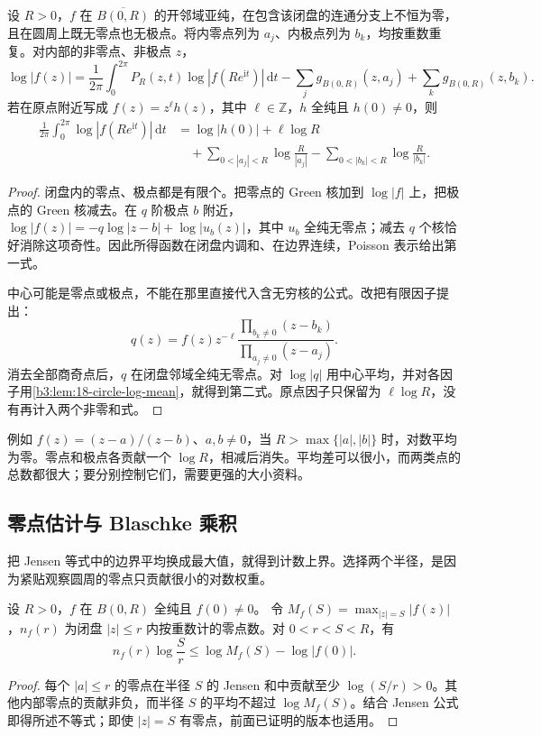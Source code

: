 \begin{proposition}\label{b3:prop:18-meromorphic-jensen}
设 \(R>0\)，\(f\) 在 \(\overline{B(0,R)}\) 的开邻域亚纯，在包含该闭盘的连通分支上不恒为零，且在圆周上既无零点也无极点。将内零点列为 \(a_j\)、内极点列为 \(b_k\)，均按重数重复。对内部的非零点、非极点 \(z\)，
\[
 \log|f(z)|=\frac1{2\pi}\int_0^{2\pi}
 P_R(z,t)\log|f(Re^{\mathrm it})|\,\mathrm dt
 -\sum_jg_{B(0,R)}(z,a_j)+\sum_kg_{B(0,R)}(z,b_k).
\]
若在原点附近写成 \(f(z)=z^\ell h(z)\)，其中
\(\ell\in\mathbb Z\)，\(h\) 全纯且 \(h(0)\ne0\)，则
\begin{align*}
 \frac1{2\pi}\int_0^{2\pi}\log|f(Re^{\mathrm it})|\,\mathrm dt
 &=\log|h(0)|+\ell\log R\\
 &\quad+\sum_{0<|a_j|<R}\log\frac R{|a_j|}
       -\sum_{0<|b_k|<R}\log\frac R{|b_k|}.
\end{align*}
\end{proposition}
\begin{proof}
闭盘内的零点、极点都是有限个。把零点的 Green 核加到 \(\log|f|\) 上，把极点的 Green 核减去。在 \(q\) 阶极点 \(b\) 附近，
\(\log|f(z)|=-q\log|z-b|+\log|u_b(z)|\)，其中 \(u_b\) 全纯无零点；减去 \(q\) 个核恰好消除这项奇性。因此所得函数在闭盘内调和、在边界连续，Poisson 表示给出第一式。

中心可能是零点或极点，不能在那里直接代入含无穷核的公式。改把有限因子提出：
\[
 q(z)=f(z)z^{-\ell}
   \frac{\prod_{b_k\ne0}(z-b_k)}{\prod_{a_j\ne0}(z-a_j)}.
\]
消去全部商奇点后，\(q\) 在闭盘邻域全纯无零点。对 \(\log|q|\) 用中心平均，并对各因子用\cref{b3:lem:18-circle-log-mean}，就得到第二式。原点因子只保留为 \(\ell\log R\)，没有再计入两个非零和式。
\end{proof}

例如 \(f(z)=(z-a)/(z-b)\)、\(a,b\ne0\)，当
\(R>\max\{|a|,|b|\}\) 时，对数平均为零。零点和极点各贡献一个 \(\log R\)，相减后消失。平均差可以很小，而两类点的总数都很大；要分别控制它们，需要更强的大小资料。

\subsection{零点估计与 Blaschke 乘积}
\label{b3:subsec:180203}

把 Jensen 等式中的边界平均换成最大值，就得到计数上界。选择两个半径，是因为紧贴观察圆周的零点只贡献很小的对数权重。

\begin{corollary}[两半径零点估计]\label{b3:cor:18-zero-estimate}
设 \(R>0\)，\(f\) 在 \(B(0,R)\) 全纯且 \(f(0)\ne0\)。
令 \(M_f(S)=\max_{|z|=S}|f(z)|\)，\(n_f(r)\) 为闭盘
\(|z|\le r\) 内按重数计的零点数。对 \(0<r<S<R\)，有
\[
 n_f(r)\log\frac Sr\le\log M_f(S)-\log|f(0)|.
\]
\end{corollary}
\begin{proof}
每个 \(|a|\le r\) 的零点在半径 \(S\) 的 Jensen 和中贡献至少
\(\log(S/r)>0\)。其他内部零点的贡献非负，而半径 \(S\) 的平均不超过 \(\log M_f(S)\)。结合 Jensen 公式即得所述不等式；即使 \(|z|=S\) 有零点，前面已证明的版本也适用。
\end{proof}

